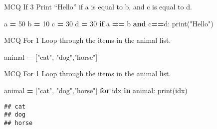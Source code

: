 \documentclass[
  8pt,
  ignorenonframetext,
]{beamer}
\newenvironment{Shaded}{\begin{snugshade}}{\end{snugshade}}
\newcommand{\BuiltInTok}[1]{#1}
\newcommand{\ControlFlowTok}[1]{\textcolor[rgb]{0.13,0.29,0.53}{\textbf{#1}}}
\newcommand{\DecValTok}[1]{\textcolor[rgb]{0.00,0.00,0.81}{#1}}
\newcommand{\KeywordTok}[1]{\textcolor[rgb]{0.13,0.29,0.53}{\textbf{#1}}}
\newcommand{\NormalTok}[1]{#1}
\newcommand{\OperatorTok}[1]{\textcolor[rgb]{0.81,0.36,0.00}{\textbf{#1}}}
\newcommand{\StringTok}[1]{\textcolor[rgb]{0.31,0.60,0.02}{#1}}
\begin{document}
\begin{frame}[fragile]{MCQ If 3}
\protect\hypertarget{mcq-if-3-1}{}
Print ``Hello'' if a is equal to b, and c is equal to d.

\begin{Shaded}
\begin{Highlighting}[]
\NormalTok{a }\OperatorTok{=} \DecValTok{50}
\NormalTok{b }\OperatorTok{=} \DecValTok{10}
\NormalTok{c }\OperatorTok{=} \DecValTok{30}
\NormalTok{d }\OperatorTok{=} \DecValTok{30}
\ControlFlowTok{if}\NormalTok{ a }\OperatorTok{==}\NormalTok{ b }\KeywordTok{and}\NormalTok{ c}\OperatorTok{==}\NormalTok{d:}
  \BuiltInTok{print}\NormalTok{(}\StringTok{"Hello"}\NormalTok{)}
\end{Highlighting}
\end{Shaded}
\end{frame}

\begin{frame}[fragile]{MCQ For 1}
\protect\hypertarget{mcq-for-1}{}
Loop through the items in the animal list.

\begin{Shaded}
\begin{Highlighting}[]
\NormalTok{animal }\OperatorTok{=}\NormalTok{ [}\StringTok{"cat"}\NormalTok{, }\StringTok{"dog"}\NormalTok{,}\StringTok{"horse"}\NormalTok{]}
\end{Highlighting}
\end{Shaded}
\end{frame}

\begin{frame}[fragile]{MCQ For 1}
\protect\hypertarget{mcq-for-1-1}{}
Loop through the items in the animal list.

\begin{Shaded}
\begin{Highlighting}[]
\NormalTok{animal }\OperatorTok{=}\NormalTok{ [}\StringTok{"cat"}\NormalTok{, }\StringTok{"dog"}\NormalTok{,}\StringTok{"horse"}\NormalTok{]}
\ControlFlowTok{for}\NormalTok{ idx }\KeywordTok{in}\NormalTok{ animal:}
  \BuiltInTok{print}\NormalTok{(idx)}
\end{Highlighting}
\end{Shaded}

\begin{verbatim}
## cat
## dog
## horse
\end{verbatim}
\end{frame}
\end{document}
